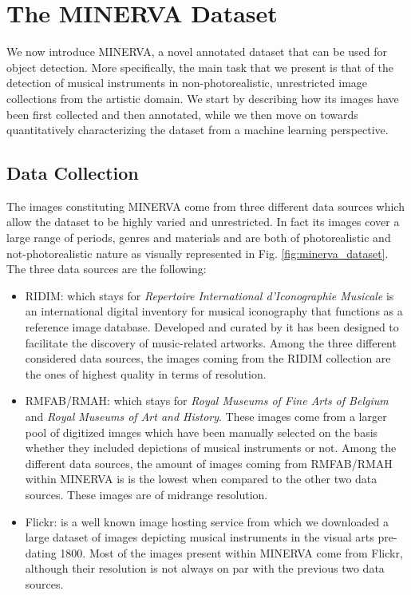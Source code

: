 \section{The MINERVA Dataset}
\label{sec:minerva_dataset}

We now introduce MINERVA, a novel annotated dataset that can be used for object detection. More specifically, the main task that we present is that of the detection of musical instruments in non-photorealistic, unrestricted image collections from the artistic domain. We start by describing how its images have been first collected and then annotated, while we then move on towards quantitatively characterizing the dataset from a machine learning perspective.    

\subsection{Data Collection}
The images constituting MINERVA come from three different data sources which allow the dataset to be highly varied and unrestricted. In fact its images cover a large range of periods, genres and materials and are both of photorealistic and not-photorealistic nature as visually represented in Fig. \ref{fig:minerva_dataset}. The three data sources are the following:
\begin{itemize}
	\item RIDIM: which stays for \textit{Repertoire International d'Iconographie Musicale} is an international digital inventory for musical iconography that functions as a reference image database. Developed and curated by \citet{green2013ridim} it has been designed to facilitate the discovery of music-related artworks. Among the three different considered data sources, the images coming from the RIDIM collection are the ones of highest quality in terms of resolution.
	\item RMFAB/RMAH: which stays for \textit{Royal Museums of Fine Arts of Belgium} and \textit{Royal Museums of Art and History}. These images come from a larger pool of digitized images which have been manually selected on the basis whether they included depictions of musical instruments or not. Among the different data sources, the amount of images coming from RMFAB/RMAH within MINERVA is is the lowest when compared to the other two data sources. These images are of midrange resolution.
	\item Flickr: is a well known image hosting service from which we downloaded a large dataset of images depicting musical instruments in the visual arts pre-dating 1800. Most of the images present within MINERVA come from Flickr, although their resolution is not always on par with the previous two data sources.  
\end{itemize}

